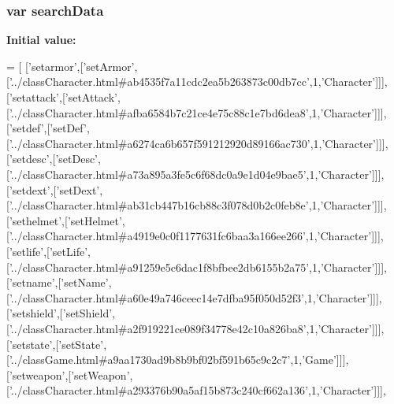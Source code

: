 \subsubsection[{search\-Data}]{\setlength{\rightskip}{0pt plus 5cm}var search\-Data}\label{functions__d_8js_ad01a7523f103d6242ef9b0451861231e}
{\bfseries Initial value\-:}
\begin{DoxyCode}
=
[
  [\textcolor{stringliteral}{'setarmor'},[\textcolor{stringliteral}{'setArmor'},[\textcolor{stringliteral}{'../classCharacter.html#ab4535f7a11cdc2ea5b263873c00db7cc'},1,\textcolor{stringliteral}{'Character'}]]],
  [\textcolor{stringliteral}{'setattack'},[\textcolor{stringliteral}{'setAttack'},[\textcolor{stringliteral}{'../classCharacter.html#afba6584b7c21ce4e75c88c1e7bd6dea8'},1,\textcolor{stringliteral}{'Character'}]]],
  [\textcolor{stringliteral}{'setdef'},[\textcolor{stringliteral}{'setDef'},[\textcolor{stringliteral}{'../classCharacter.html#a6274ca6b657f591212920d89166ac730'},1,\textcolor{stringliteral}{'Character'}]]],
  [\textcolor{stringliteral}{'setdesc'},[\textcolor{stringliteral}{'setDesc'},[\textcolor{stringliteral}{'../classCharacter.html#a73a895a3fe5c6f68dc0a9e1d04e9bae5'},1,\textcolor{stringliteral}{'Character'}]]],
  [\textcolor{stringliteral}{'setdext'},[\textcolor{stringliteral}{'setDext'},[\textcolor{stringliteral}{'../classCharacter.html#ab31cb447b16cb88c3f078d0b2c0feb8e'},1,\textcolor{stringliteral}{'Character'}]]],
  [\textcolor{stringliteral}{'sethelmet'},[\textcolor{stringliteral}{'setHelmet'},[\textcolor{stringliteral}{'../classCharacter.html#a4919e0c0f1177631fc6baa3a166ee266'},1,\textcolor{stringliteral}{'Character'}]]],
  [\textcolor{stringliteral}{'setlife'},[\textcolor{stringliteral}{'setLife'},[\textcolor{stringliteral}{'../classCharacter.html#a91259e5c6dac1f8bfbee2db6155b2a75'},1,\textcolor{stringliteral}{'Character'}]]],
  [\textcolor{stringliteral}{'setname'},[\textcolor{stringliteral}{'setName'},[\textcolor{stringliteral}{'../classCharacter.html#a60e49a746ceec14e7dfba95f050d52f3'},1,\textcolor{stringliteral}{'Character'}]]],
  [\textcolor{stringliteral}{'setshield'},[\textcolor{stringliteral}{'setShield'},[\textcolor{stringliteral}{'../classCharacter.html#a2f919221ce089f34778e42c10a826ba8'},1,\textcolor{stringliteral}{'Character'}]]],
  [\textcolor{stringliteral}{'setstate'},[\textcolor{stringliteral}{'setState'},[\textcolor{stringliteral}{'../classGame.html#a9aa1730ad9b8b9bf02bf591b65c9c2c7'},1,\textcolor{stringliteral}{'Game'}]]],
  [\textcolor{stringliteral}{'setweapon'},[\textcolor{stringliteral}{'setWeapon'},[\textcolor{stringliteral}{'../classCharacter.html#a293376b90a5af15b873c240cf662a136'},1,\textcolor{stringliteral}{'Character'}]]],

\end{DoxyCode}
